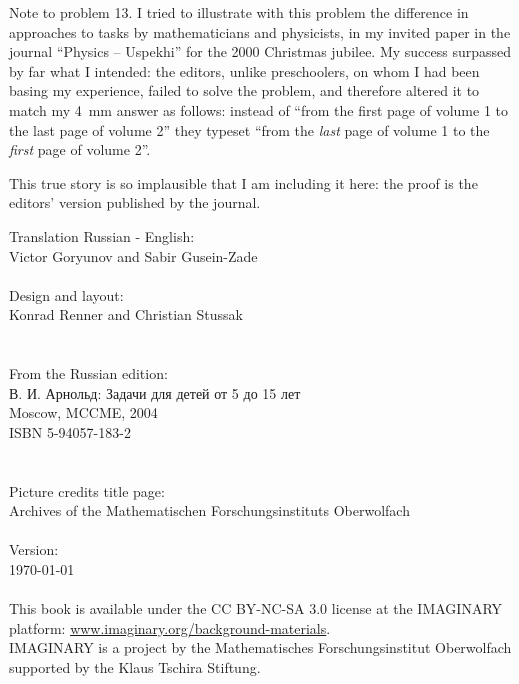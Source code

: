 \vfill
\begin{note}{Note to problem 13.}
	I tried to illustrate with this problem the difference in approaches to tasks by mathematicians and physicists, in my invited paper in the journal \enquote{Physics -- Uspekhi} for the 2000 Christmas jubilee. My success surpassed by far what I intended: the editors, unlike preschoolers, on whom I had been basing my experience, failed to solve the problem, and therefore altered it to match my \SI{4}{\mm} answer as follows: instead of \enquote{from the first page of volume 1 to the last page of volume 2} they typeset \enquote{from the \emph{last} page of volume 1 to the \emph{first} page of volume 2}.

	This true story is so implausible that I am including it here: the proof is the editors' version published by the journal.
\end{note}
\clearpage
\null\vfill
\noindent
Translation Russian - English:\\
\null\quad Victor Goryunov and Sabir Gusein-Zade\\
\\
Design and layout:\\
\null\quad Konrad Renner and Christian Stussak\\
\\
\\
From the Russian edition:\\
\null\quad \textrussian{В. И. Арнольд: Задачи для детей от 5 до 15 лет}\\
\null\quad Moscow, MCCME, 2004\\
\null\quad ISBN 5-94057-183-2\\
\\
\\
Picture credits title page:\\
\null\quad Archives of the Mathematischen Forschungsinstituts Oberwolfach\\
\\
Version:\\
\null\quad \today\\
\\
This book is available under the CC BY-NC-SA 3.0 license at the IMAG\-I\-NARY platform: \href{http://www.imaginary.org/background-materials}{www.imaginary.org/background-materials}.\\
IMAGINARY is a project by the Mathematisches Forschungsinstitut Oberwolfach supported by the Klaus Tschira Stiftung.

